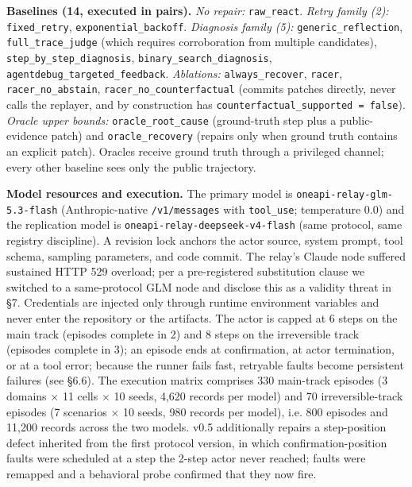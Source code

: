 \documentclass[10pt]{article}
\begin{document}
\textbf{Baselines (14, executed in pairs).} \emph{No repair:} \texttt{raw\_react}. \emph{Retry family (2):} \texttt{fixed\_retry}, \texttt{exponential\_backoff}. \emph{Diagnosis family (5):} \texttt{generic\_reflection}, \texttt{full\_trace\_judge} (which requires corroboration from multiple candidates), \texttt{step\_by\_step\_diagnosis}, \texttt{binary\_search\_diagnosis}, \texttt{agentdebug\_targeted\_feedback}. \emph{Ablations:} \texttt{always\_recover}, \texttt{racer}, \texttt{racer\_no\_abstain}, \texttt{racer\_no\_counterfactual} (commits patches directly, never calls the replayer, and by construction has \texttt{counterfactual\_supported = false}). \emph{Oracle upper bounds:} \texttt{oracle\_root\_cause} (ground-truth step plus a public-evidence patch) and \texttt{oracle\_recovery} (repairs only when ground truth contains an explicit patch). Oracles receive ground truth through a privileged channel; every other baseline sees only the public trajectory.

\textbf{Model resources and execution.} The primary model is \texttt{oneapi-relay-glm-5.3-flash} (Anthropic-native \texttt{/v1/messages} with \texttt{tool\_use}; temperature 0.0) and the replication model is \texttt{oneapi-relay-deepseek-v4-flash} (same protocol, same registry discipline). A revision lock anchors the actor source, system prompt, tool schema, sampling parameters, and code commit. The relay's Claude node suffered sustained HTTP 529 overload; per a pre-registered substitution clause we switched to a same-protocol GLM node and disclose this as a validity threat in \S7. Credentials are injected only through runtime environment variables and never enter the repository or the artifacts. The actor is capped at 6 steps on the main track (episodes complete in 2) and 8 steps on the irreversible track (episodes complete in 3); an episode ends at confirmation, at actor termination, or at a tool error; because the runner fails fast, retryable faults become persistent failures (see \S6.6). The execution matrix comprises 330 main-track episodes (3 domains $\times$ 11 cells $\times$ 10 seeds, 4,620 records per model) and 70 irreversible-track episodes (7 scenarios $\times$ 10 seeds, 980 records per model), i.e. 800 episodes and 11,200 records across the two models. v0.5 additionally repairs a step-position defect inherited from the first protocol version, in which confirmation-position faults were scheduled at a step the 2-step actor never reached; faults were remapped and a behavioral probe confirmed that they now fire.
\end{document}
